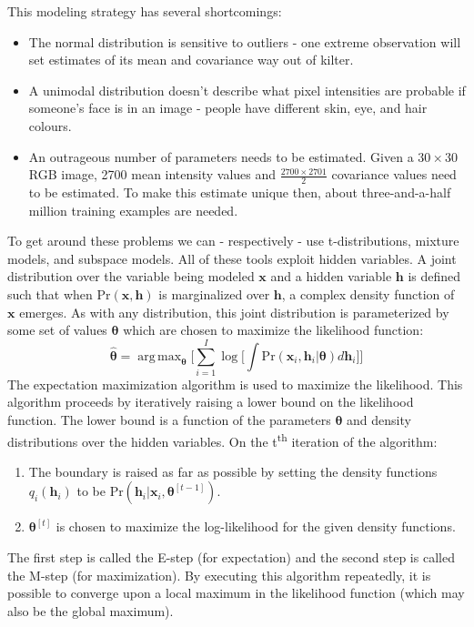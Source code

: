 \documentclass[idxtotoc,hyperref,openany]{labbook} %
\DeclareMathOperator*{\argmax}{arg\,max}
\begin{document}
This modeling strategy has several shortcomings:
\begin{itemize}
	\item The normal distribution is sensitive to outliers - one extreme observation will set estimates of its mean and covariance way out of kilter.
	\item A unimodal distribution doesn't describe what pixel intensities are probable if someone's face is in an image - people have different skin, eye, and hair colours.
	\item An outrageous number of parameters needs to be estimated. Given a $30\times30$ RGB image, 2700 mean intensity values and $\frac{2700 \times 2701}{2}$ covariance values need to be estimated. To make this estimate unique then, about three-and-a-half million training examples are needed.
\end{itemize}
To get around these problems we can - respectively - use t-distributions, mixture models, and subspace models. All of these tools exploit hidden variables. A joint distribution over the variable being modeled $\mathbf{x}$ and a hidden variable $\mathbf{h}$ is defined such that when $\text{Pr}(\mathbf{x}, \mathbf{h})$ is marginalized over $\mathbf{h}$, a complex density function of $\mathbf{x}$ emerges. As with any distribution, this joint distribution is parameterized by some set of values $\mathbf{\theta}$ which are chosen to maximize the likelihood function:
\[
	\hat{\mathbf{\theta}} = \argmax_{\mathbf{\theta}} \Bigg[\sum_{i = 1}^I \log \Big[\int \text{Pr}(\mathbf{x}_i, \mathbf{h}_i | \mathbf{\theta})d\mathbf{h}_i\Big]\Bigg]
\]
The expectation maximization algorithm is used to maximize the likelihood. This algorithm proceeds by iteratively raising a lower bound on the likelihood function. The lower bound is a function of the parameters $\mathbf{\theta}$ and density distributions over the hidden variables. On the t\textsuperscript{th} iteration of the algorithm:
\begin{enumerate}
\item The boundary is raised as far as possible by setting the density functions $q_i(\mathbf{h}_i)$ to be $\text{Pr}(\mathbf{h}_i|\mathbf{x}_i, \mathbf{\theta}^[t-1])$.
\item $\mathbf{\theta}^{[t]}$ is chosen to maximize the log-likelihood for the given density functions. 
\end{enumerate}
The first step is called the E-step (for expectation) and the second step is called the M-step (for maximization). By executing this algorithm repeatedly, it is possible to converge upon a local maximum in the likelihood function (which may also be the global maximum).
\end{document}
